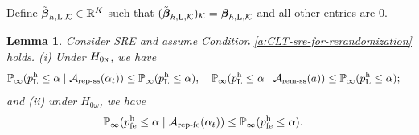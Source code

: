 \documentclass[12pt]{article}
\newtheorem{lemma}{Lemma}
\newcommand{\hpfe}{p_\textnormal{fe}^{\textnormal{h}}}
\newcommand{\Lin}{\textnormal{L}}
\newcommand{\Prob}{\mathbb{P}}
\newcommand{\mk}{\mathcal{K}}
\newcommand{\ma}{\mathcal{A}}
\newcommand{\remss}{\textnormal{rem-ss}}
\newcommand{\repss}{\textnormal{rep-ss}}
\newcommand{\repfe}{\textnormal{rep-fe}}
\newcommand{\bs}{\boldsymbol}
\newcommand{\hpL}{p_\textnormal{L}^{\textnormal{h}}}
\begin{document}
Define $\tilde{\bs{\beta}}_{h,\Lin,\mk}\in \mathbb{R}^K$ such that $(\tilde{\bs{\beta}}_{h,\Lin,\mk})_{\mk} = \bs{\beta}_{h,\Lin,\mk}$ and all other entries are $0$.

\begin{lemma}
\label{lem:re-mitigate-p-hacking-sre-(i)}
Consider SRE and assume Condition \ref{a:CLT-sre-for-rerandomization} holds. 
 (i) Under $H_{0\textsc{n}}$, we have
    \begin{align*}
        &\Prob_{\infty}(\hpL \leq \alpha\mid \ma_{\repss}(\alpha_t)) \leq \Prob_{\infty}(\hpL \leq \alpha), \quad \Prob_{\infty}(\hpL \leq \alpha\mid \ma_{\remss}(a)) \leq \Prob_{\infty}(\hpL \leq \alpha);
    \end{align*}
and (ii) under $H_{0\omega}$, we have
 \begin{align*}
            &\Prob_{\infty}(\hpfe \leq \alpha\mid \ma_{\repfe}(\alpha_t)) \leq \Prob_{\infty}(\hpfe \leq \alpha).
 \end{align*}
\end{lemma}
\end{document}
